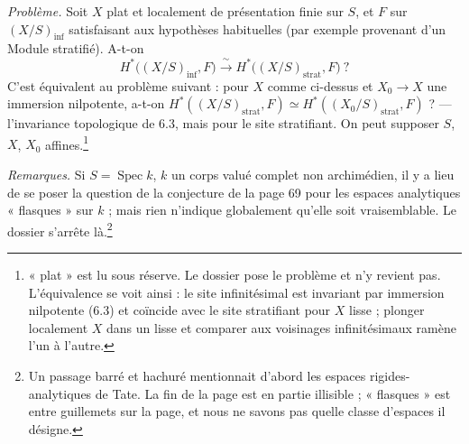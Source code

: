 \documentclass[11pt,a4paper]{article}
\begin{document}
\emph{Problème.} Soit $X$ plat et localement de présentation finie sur $S$,
et $F$ sur $(X/S)_{\mathrm{inf}}$ satisfaisant aux hypothèses habituelles
(par exemple provenant d'un Module stratifié). A-t-on
\[
  H^{*}\bigl((X/S)_{\mathrm{inf}}, F\bigr) \xrightarrow{\ \sim\ }
  H^{*}\bigl((X/S)_{\mathrm{strat}}, F\bigr) \ ?
\]
C'est équivalent au problème suivant : pour $X$ comme ci-dessus et
$X_0 \to X$ une immersion nilpotente, a-t-on
$H^{*}((X/S)_{\mathrm{strat}}, F) \simeq H^{*}((X_0/S)_{\mathrm{strat}}, F)$ ?
— l'invariance topologique de 6.3, mais pour le site stratifiant. On peut
supposer $S$, $X$, $X_0$ affines.\footnote{« plat » est lu sous réserve. Le
dossier pose le problème et n'y revient pas. L'équivalence se voit ainsi :
le site infinitésimal est invariant par immersion nilpotente (6.3) et
coïncide avec le site stratifiant pour $X$ lisse ; plonger localement $X$
dans un lisse et comparer aux voisinages infinitésimaux ramène l'un à
l'autre.}

\emph{Remarques.} Si $S = \operatorname{Spec} k$, $k$ un corps valué complet
non archimédien, il y a lieu de se poser la question de la conjecture de la
page 69 pour les espaces analytiques « flasques » sur $k$ ; mais rien
n'indique globalement qu'elle soit vraisemblable. Le dossier s'arrête
là.\footnote{Un passage barré et hachuré mentionnait d'abord les espaces
rigides-analytiques de Tate. La fin de la page est en partie illisible ;
« flasques » est entre guillemets sur la page, et nous ne savons pas quelle
classe d'espaces il désigne.}
\end{document}
